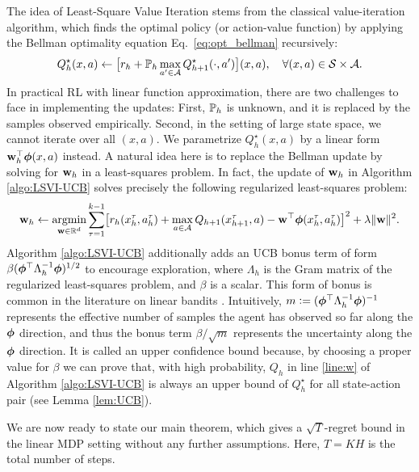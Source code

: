The idea of Least-Square Value Iteration \cite{bradtke1996linear,osband2014generalization} stems from the classical value-iteration algorithm, which finds the optimal policy (or action-value function) by applying the Bellman optimality equation Eq.~\eqref{eq:opt_bellman} recursively:
\begin{equation*}
\sind{Q}{\star}{h}(x, a) \leftarrow \bigl[r_h + \P_h \max_{a'\in\cA}\sind{Q}{\star}{h+1}(\cdot, a')\bigr](x, a), \quad \forall(x, a) \in \cS\times \cA.
\end{equation*}
In practical RL with linear function approximation, there are two challenges to face in implementing the updates: First, $\P_h$ is unknown, and it is replaced by the samples observed empirically. Second, in the setting of large state space, we cannot iterate over all $(x, a)$. We parametrize $Q_h^\star(x, a)$ by a linear form $\w_h\trans \bphi(x, a)$ instead. A natural idea here is to replace the Bellman update by solving for $\w_h$ in a least-squares problem. In fact, the update of $\w_h$ in Algorithm \ref{algo:LSVI-UCB} solves precisely the following regularized least-squares problem:
\begin{equation*}
\w_h \leftarrow \argmin_{\w \in \R^d} \sum_{\tau = 1}^{k-1} \bigl [r_h ( x_h^\tau , a_h^\tau) + \max_{a \in \cA } Q_{h+1} ( x_{h+1} ^\tau, a) - \w ^\top \bphi ( x_h^{\tau },  a_h^\tau )    \bigr ]^2 + \lambda  \| \w \|^2.
\end{equation*}
Algorithm \ref{algo:LSVI-UCB} additionally adds an UCB bonus term of form $\beta (\bphi\trans \Lambda_h^{-1} \bphi)^{1/2}$ to encourage exploration, where $\Lambda_h$ is the Gram matrix of the regularized least-squares problem, and $\beta$ is a scalar. This form of bonus is common in the literature on linear bandits \cite{bubeck2012regret, lattimore2018bandit}. Intuitively, $m \defeq (\bphi\trans \Lambda_h^{-1} \bphi)^{-1}$ represents the effective number of samples the agent has observed so far along the $\bphi$ direction, and thus the bonus term $\beta/\sqrt{m}$ represents the uncertainty along the $\bphi$ direction. It is called an upper confidence bound because, by choosing a proper value for $\beta$ we can prove that, with high probability, $Q_h$ in line \ref{line:w} of Algorithm \ref{algo:LSVI-UCB} is always an upper bound of $Q_h^\star$ for all state-action pair (see Lemma \ref{lem:UCB}).

We are now ready to state our main theorem, which gives a $\sqrt{T}$-regret bound in the linear MDP setting without any further assumptions. Here, $T=KH$ is the total number of steps.

